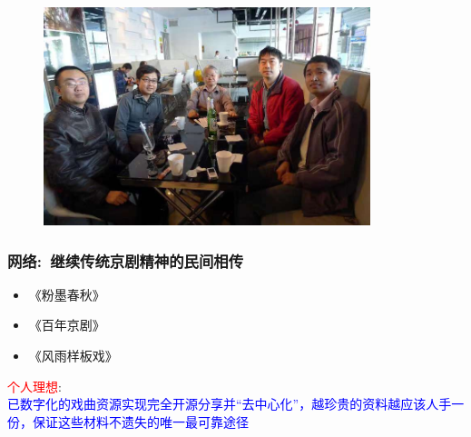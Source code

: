 \documentclass[cjk,slidestop,compress,mathserif,blue]{beamer}
\begin{document}
\frame
{
	\frametitle{}
\begin{figure}[h!]
\centering
\vspace{-0.05in}
\includegraphics[height=0.6\textwidth,width=0.85\textwidth,clip]{Figures/PekOpe_Xiyou-2.jpg}
\label{Xiyou-2}
\end{figure}
}

\frame
{
	\frametitle{网络:~继续传统京剧精神的民间相传}
	\begin{itemize}
   		\setlength{\itemsep}{15pt}
		\item 《粉墨春秋》
		\item 《百年京剧》
		\item 《风雨样板戏》
	\end{itemize}
	\textcolor{red}{个人理想}:\\
\textcolor{blue}{已数字化的戏曲资源实现完全开源分享并“去中心化”，越珍贵的资料越应该人手一份，保证这些材料不遗失的唯一最可靠途径}
}
\end{document}

